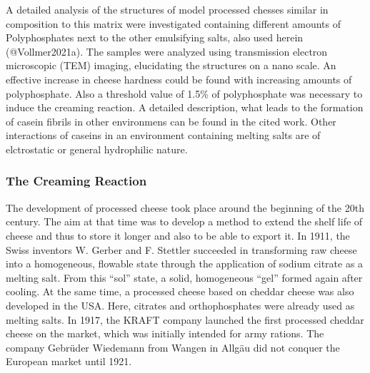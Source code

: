 \documentclass[
]{article}
\begin{document}
A detailed analysis of the structures of model processed chesses similar
in composition to this matrix were investigated containing different
amounts of Polyphosphates next to the other emulsifying salts, also used
herein (@Vollmer2021a). The samples were analyzed using transmission
electron microscopic (TEM) imaging, elucidating the structures on a nano
scale. An effective increase in cheese hardness could be found with
increasing amounts of polyphosphate. Also a threshold value of 1.5\% of
polyphosphate was necessary to induce the creaming reaction. A detailed
description, what leads to the formation of casein fibrils in other
environmens can be found in the cited work. Other interactions of
caseins in an environment containing melting salts are of elctrostatic
or general hydrophilic nature.

\subsubsection{The Creaming Reaction}

The development of processed cheese took place around the beginning of
the 20th century. The aim at that time was to develop a method to extend
the shelf life of cheese and thus to store it longer and also to be able
to export it. In 1911, the Swiss inventors W. Gerber and F. Stettler
succeeded in transforming raw cheese into a homogeneous, flowable state
through the application of sodium citrate as a melting salt. From this
``sol'' state, a solid, homogeneous ``gel'' formed again after cooling.
At the same time, a processed cheese based on cheddar cheese was also
developed in the USA. Here, citrates and orthophosphates were already
used as melting salts. In 1917, the KRAFT company launched the first
processed cheddar cheese on the market, which was initially intended for
army rations. The company Gebrüder Wiedemann from Wangen in Allgäu did
not conquer the European market until 1921.
\end{document}
